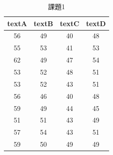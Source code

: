 \begin{table}[ht]
	\centering

	\caption{課題1}
	\begin{tabular}{cccc}
		\hline
		textA & textB & textC & textD \\
		\hline
		56    & 49    & 40    & 48    \\
		55    & 53    & 41    & 53    \\
		62    & 49    & 47    & 54    \\
		53    & 52    & 48    & 51    \\
		53    & 52    & 43    & 51    \\
		56    & 46    & 40    & 48    \\
		59    & 49    & 44    & 45    \\
		51    & 51    & 43    & 49    \\
		57    & 54    & 43    & 51    \\
		59    & 50    & 49    & 49    \\
		\hline
	\end{tabular}
	\label{L23::exe1}
\end{table}
